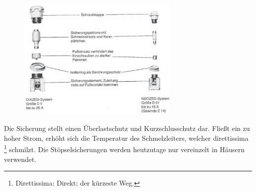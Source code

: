 \begin{enumerate}
            \begin{figure}[!htp]
                \centering
                \includegraphics[width = 0.7\textwidth]{img/Stopsel_Aufbau_2.png}
            \end{figure}
            Die Sicherung stellt einen Überlastschutz und Kurzschlusschutz dar. Fließt ein zu hoher Strom, erhöht sich die Temperatur des Schmelzleiters, welcher 
            direttissima \footnote{Direttissima: Direkt; der kürzeste Weg.} schmilzt. Die Stöpselsicherungen werden heutzutage nur vereinzelt in Häusern verwendet.
            \clearpage


\end{enumerate}
